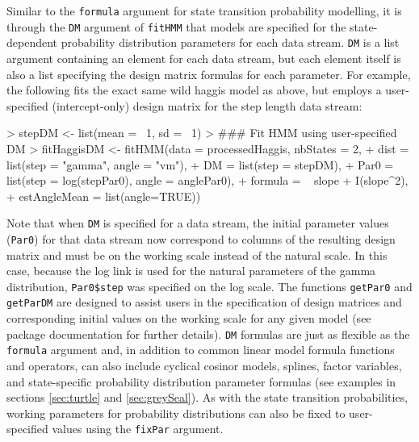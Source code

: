 \documentclass[12pt]{article}
\begin{document}
Similar to the \verb|formula| argument for state transition probability modelling, it is through the \verb|DM| argument of \verb|fitHMM| that models are specified for the state-dependent probability distribution parameters for each data stream.  \verb|DM| is a list argument containing an element for each data stream, but each element itself is also a list specifying the design matrix formulas for each parameter. For example, the following fits the exact same wild haggis model as above, but employs a user-specified (intercept-only) design matrix for the step length data stream:
\begin{Schunk}
\begin{Sinput}
> stepDM <- list(mean = ~1, sd = ~1)
> ### Fit HMM	using user-specified DM
> fitHaggisDM <- fitHMM(data = processedHaggis, nbStates = 2,
+                       dist = list(step = "gamma", angle = "vm"),
+                       DM = list(step = stepDM),
+                       Par0 = list(step = log(stepPar0), angle = anglePar0),
+                       formula = ~ slope + I(slope^2),
+                       estAngleMean = list(angle=TRUE))
\end{Sinput}
\end{Schunk}
Note that when \verb|DM| is specified for a data stream, the initial parameter values (\verb|Par0|) for that data stream now correspond to columns of the resulting design matrix and must be on the working scale instead of the natural scale.  In this case, because the log link is used for the natural parameters of the gamma distribution, \verb|Par0$step| was specified on the log scale.  The functions \verb|getPar0| and \verb|getParDM| are designed to assist users in the specification of design matrices and corresponding initial values on the working scale for any given model (see package documentation for further details).  \verb|DM| formulas are just as flexible as the \verb|formula| argument and, in addition to common linear model formula functions and operators, can also include cyclical cosinor models, splines, factor variables, and state-specific probability distribution parameter formulas (see examples in sections \ref{sec:turtle} and \ref{sec:greySeal}). As with the state transition probabilities, working parameters for probability distributions can also be fixed to user-specified values using the \verb|fixPar| argument.
\end{document}
